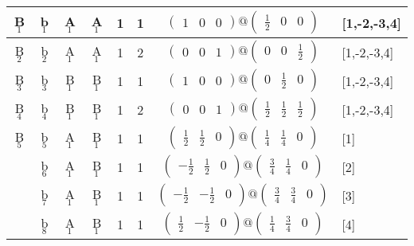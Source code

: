 \documentclass[fleqn,10pt,landscape]{article}
\begin{document}
\begin{itemize}
\begin{center}
\begin{longtable}{cc|cc|c|c|c|l}
B$_{1}$ & b$_{1}$ & A$_{1}$ & A$_{1}$ & 1 & 1 & $\begin{pmatrix} 1 & 0 & 0 \end{pmatrix}@\begin{pmatrix} \frac{1}{2} & 0 & 0 \end{pmatrix}$ & [1,-2,-3,4] \\ \hline
B$_{2}$ & b$_{2}$ & A$_{1}$ & A$_{1}$ & 1 & 2 & $\begin{pmatrix} 0 & 0 & 1 \end{pmatrix}@\begin{pmatrix} 0 & 0 & \frac{1}{2} \end{pmatrix}$ & [1,-2,-3,4] \\ \hline
B$_{3}$ & b$_{3}$ & B$_{1}$ & B$_{1}$ & 1 & 1 & $\begin{pmatrix} 1 & 0 & 0 \end{pmatrix}@\begin{pmatrix} 0 & \frac{1}{2} & 0 \end{pmatrix}$ & [1,-2,-3,4] \\ \hline
B$_{4}$ & b$_{4}$ & B$_{1}$ & B$_{1}$ & 1 & 2 & $\begin{pmatrix} 0 & 0 & 1 \end{pmatrix}@\begin{pmatrix} \frac{1}{2} & \frac{1}{2} & \frac{1}{2} \end{pmatrix}$ & [1,-2,-3,4] \\ \hline
B$_{5}$ & b$_{5}$ & A$_{1}$ & B$_{1}$ & 1 & 1 & $\begin{pmatrix} \frac{1}{2} & \frac{1}{2} & 0 \end{pmatrix}@\begin{pmatrix} \frac{1}{4} & \frac{1}{4} & 0 \end{pmatrix}$ & [1] \\
& b$_{6}$ & A$_{1}$ & B$_{1}$ & 1 & 1 & $\begin{pmatrix} - \frac{1}{2} & \frac{1}{2} & 0 \end{pmatrix}@\begin{pmatrix} \frac{3}{4} & \frac{1}{4} & 0 \end{pmatrix}$ & [2] \\
& b$_{7}$ & A$_{1}$ & B$_{1}$ & 1 & 1 & $\begin{pmatrix} - \frac{1}{2} & - \frac{1}{2} & 0 \end{pmatrix}@\begin{pmatrix} \frac{3}{4} & \frac{3}{4} & 0 \end{pmatrix}$ & [3] \\
& b$_{8}$ & A$_{1}$ & B$_{1}$ & 1 & 1 & $\begin{pmatrix} \frac{1}{2} & - \frac{1}{2} & 0 \end{pmatrix}@\begin{pmatrix} \frac{1}{4} & \frac{3}{4} & 0 \end{pmatrix}$ & [4] \\
\end{longtable}
\end{center}


\end{itemize}
\end{document}
